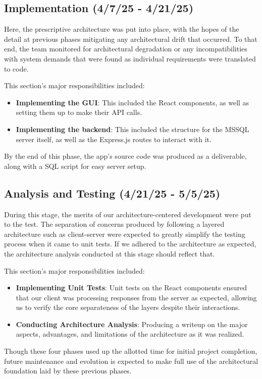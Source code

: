 \subsection{Implementation (4/7/25 - 4/21/25)}

Here, the prescriptive architecture was put into place, with the hopes of the detail at previous phases mitigating any architectural drift that occurred. To that end, the team monitored for architectural degradation or any incompatibilities with system demands that were found as individual requirements were translated to code.

This section's major responsibilities included:
\begin{itemize}
    \item \textbf{Implementing the GUI}: This included the React components, as well as setting them up to make their API calls.
    \item \textbf{Implementing the backend}: This included the structure for the MSSQL server itself, as well as the Express.js routes to interact with it.
\end{itemize}

By the end of this phase, the app's source code was produced as a deliverable, along with a SQL script for easy server setup.

\subsection{Analysis and Testing (4/21/25 - 5/5/25)}

During this stage, the merits of our architecture-centered development were put to the test. The separation of concerns produced by following a layered architecture such as client-server were expected to greatly simplify the testing process when it came to unit tests. If we adhered to the architecture as expected, the architecture analysis conducted at this stage should reflect that.

This section's major responsibilities included:
\begin{itemize}
    \item \textbf{Implementing Unit Tests}: Unit tests on the React components ensured that our client was processing responses from the server as expected, allowing us to verify the core separateness of the layers despite their interactions.
    \item \textbf{Conducting Architecture Analysis}: Producing a writeup on the major aspects, advantages, and limitations of the architecture as it was realized.
\end{itemize}

Though these four phases used up the allotted time for initial project completion, future maintenance and evolution is expected to make full use of the architectural foundation laid by these previous phases.